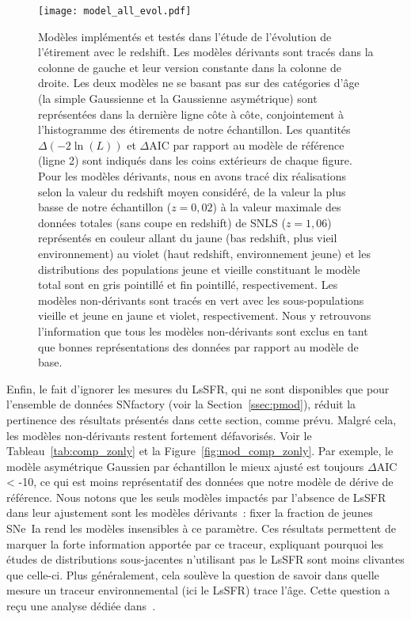 \documentclass[../main/main.tex]{subfiles}
\begin{document}
\begin{figure}[p]
    \vspace*{-3cm}
    \centerfloat
    \texttt{[image: model\_all\_evol.pdf]}
    \caption[Modèles implémentés et testés dans l'étude de l'évolution de
    l'étirement avec le redshift]{\scriptsize Modèles implémentés et testés dans
        l'étude de l'évolution de l'étirement avec le redshift. Les modèles
        dérivants sont tracés dans la colonne de gauche et leur version
        constante dans la colonne de droite. Les deux modèles ne se basant pas
        sur des catégories d'âge (la simple Gaussienne et la Gaussienne
        asymétrique) sont représentées dans la dernière ligne côte à côte,
        conjointement à l'histogramme des étirements de notre échantillon. Les
        quantités $\Delta(-2\ln(L))$ et $\Delta$AIC par rapport au modèle de
        référence (ligne 2) sont indiqués dans les coins extérieurs de chaque
        figure. Pour les modèles dérivants, nous en avons tracé dix réalisations
        selon la valeur du redshift moyen considéré, de la valeur la plus basse
        de notre échantillon ($z = 0,02$) à la valeur maximale des données
        totales (sans coupe en redshift) de SNLS ($z = 1,06$) représentés en
        couleur allant du jaune (bas redshift, plus vieil environnement) au
        violet (haut redshift, environnement jeune) et les distributions des
        populations jeune et vieille constituant le modèle total sont en gris
        pointillé et fin pointillé, respectivement. Les modèles non-dérivants
        sont tracés en vert avec les sous-populations vieille et jeune en jaune
        et violet, respectivement. Nous y retrouvons l'information que tous les
        modèles non-dérivants sont exclus en tant que bonnes représentations des
    données par rapport au modèle de base.}
    \label{fig:mod_all}
\end{figure}

Enfin, le fait d'ignorer les mesures du LsSFR, qui ne sont disponibles que pour
l'ensemble de données SNfactory (voir la Section~\ref{ssec:pmod}), réduit la
pertinence des résultats présentés dans cette section, comme prévu. Malgré cela,
les modèles non-dérivants restent fortement défavorisés. Voir le
Tableau~\ref{tab:comp_zonly} et la Figure~\ref{fig:mod_comp_zonly}. Par exemple,
le modèle asymétrique Gaussien par échantillon le mieux ajusté est toujours
$\Delta$AIC < -10, ce qui est moins représentatif des données que notre modèle
de dérive de référence. Nous notons que les seuls modèles impactés par l'absence de
LsSFR dans leur ajustement sont les modèles dérivants~: fixer la fraction de
jeunes SNe~Ia rend les modèles insensibles à ce paramètre. Ces résultats
permettent de marquer la forte information apportée par ce traceur, expliquant
pourquoi les études de distributions sous-jacentes n'utilisant pas le LsSFR sont
moins clivantes que celle-ci. Plus généralement, cela soulève la question de
savoir dans quelle mesure un traceur environnemental (ici le LsSFR) trace l'âge.
Cette question a reçu une analyse dédiée dans~\cite{briday2022}.
\end{document}
